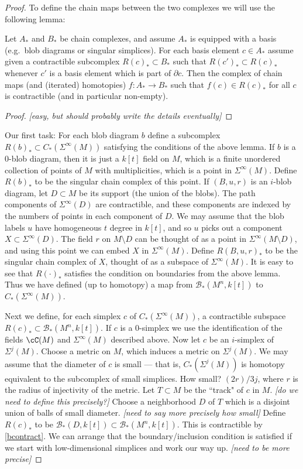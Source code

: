 \documentclass[11pt,leqno]{amsart}
\def\bc{{\mathcal B}}
\def\bd{\partial}
\def\sub{\subset}
\def\nn#1{{{\it \small [#1]}}}
\begin{document}
\begin{proof}
To define the chain maps between the two complexes we will use the following lemma:

\begin{lemma}
Let $A_*$ and $B_*$ be chain complexes, and assume $A_*$ is equipped with
a basis (e.g.\ blob diagrams or singular simplices).
For each basis element $c \in A_*$ assume given a contractible subcomplex $R(c)_* \sub B_*$
such that $R(c')_* \sub R(c)_*$ whenever $c'$ is a basis element which is part of $\bd c$.
Then the complex of chain maps (and (iterated) homotopies) $f:A_*\to B_*$ such that
$f(c) \in R(c)_*$ for all $c$ is contractible (and in particular non-empty).
\end{lemma}

\begin{proof}
\nn{easy, but should probably write the details eventually}
\end{proof}

Our first task: For each blob diagram $b$ define a subcomplex $R(b)_* \sub C_*(\Sigma^\infty(M))$
satisfying the conditions of the above lemma.
If $b$ is a 0-blob diagram, then it is just a $k[t]$ field on $M$, which is a 
finite unordered collection of points of $M$ with multiplicities, which is
a point in $\Sigma^\infty(M)$.
Define $R(b)_*$ to be the singular chain complex of this point.
If $(B, u, r)$ is an $i$-blob diagram, let $D\sub M$ be its support (the union of the blobs).
The path components of $\Sigma^\infty(D)$ are contractible, and these components are indexed 
by the numbers of points in each component of $D$.
We may assume that the blob labels $u$ have homogeneous $t$ degree in $k[t]$, and so
$u$ picks out a component $X \sub \Sigma^\infty(D)$.
The field $r$ on $M\setminus D$ can be thought of as a point in $\Sigma^\infty(M\setminus D)$,
and using this point we can embed $X$ in $\Sigma^\infty(M)$.
Define $R(B, u, r)_*$ to be the singular chain complex of $X$, thought of as a 
subspace of $\Sigma^\infty(M)$.
It is easy to see that $R(\cdot)_*$ satisfies the condition on boundaries from the above lemma.
Thus we have defined (up to homotopy) a map from 
$\bc_*(M^n, k[t])$ to $C_*(\Sigma^\infty(M))$.

Next we define, for each simplex $c$ of $C_*(\Sigma^\infty(M))$, a contractible subspace
$R(c)_* \sub \bc_*(M^n, k[t])$.
If $c$ is a 0-simplex we use the identification of the fields $\cC(M)$ and 
$\Sigma^\infty(M)$ described above.
Now let $c$ be an $i$-simplex of $\Sigma^j(M)$.
Choose a metric on $M$, which induces a metric on $\Sigma^j(M)$.
We may assume that the diameter of $c$ is small --- that is, $C_*(\Sigma^j(M))$
is homotopy equivalent to the subcomplex of small simplices.
How small?  $(2r)/3j$, where $r$ is the radius of injectivity of the metric.
Let $T\sub M$ be the ``track" of $c$ in $M$.
\nn{do we need to define this precisely?}
Choose a neighborhood $D$ of $T$ which is a disjoint union of balls of small diameter.
\nn{need to say more precisely how small}
Define $R(c)_*$ to be $\bc_*(D, k[t]) \sub \bc_*(M^n, k[t])$.
This is contractible by \ref{bcontract}.
We can arrange that the boundary/inclusion condition is satisfied if we start with
low-dimensional simplices and work our way up.
\nn{need to be more precise}


\end{proof}
\end{document}

